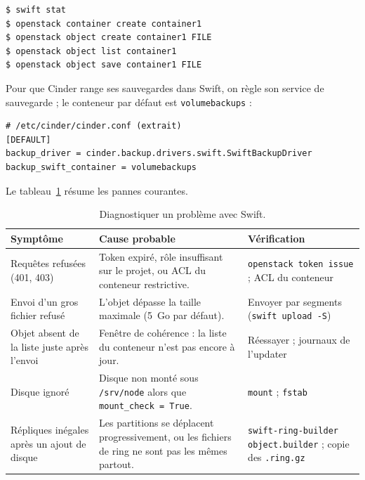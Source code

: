 \par\noindent\begin{minipage}{\linewidth}
\begin{lstlisting}[style=terminal]
$ swift stat
$ openstack container create container1
$ openstack object create container1 FILE
$ openstack object list container1
$ openstack object save container1 FILE
\end{lstlisting}
\end{minipage}\par

Pour que Cinder range ses sauvegardes dans Swift, on règle son service de sauvegarde ; le conteneur par défaut est
\texttt{volumebackups} \parencite{cinder-backup-swift} :

\par\noindent\begin{minipage}{\linewidth}
\begin{lstlisting}
# /etc/cinder/cinder.conf (extrait)
[DEFAULT]
backup_driver = cinder.backup.drivers.swift.SwiftBackupDriver
backup_swift_container = volumebackups
\end{lstlisting}
\end{minipage}\par

Le tableau~\ref{tab:sw-pannes} résume les pannes courantes.

\begin{table}[!ht]
\centering
\renewcommand{\arraystretch}{1.3}
\begin{tabular}{@{}>{\raggedright\arraybackslash}p{4.4cm}>{\raggedright\arraybackslash}p{5.8cm}>{\raggedright\arraybackslash}p{5.3cm}@{}}
\toprule
\textbf{Symptôme} & \textbf{Cause probable} & \textbf{Vérification} \\
\midrule
Requêtes refusées (401, 403) & Token expiré, rôle insuffisant sur le projet, ou ACL du conteneur restrictive. & \texttt{openstack token issue} ; ACL du conteneur \\
Envoi d'un gros fichier refusé & L'objet dépasse la taille maximale (5~Go par défaut). & Envoyer par segments (\texttt{swift upload -S}) \\
Objet absent de la liste juste après l'envoi & Fenêtre de cohérence : la liste du conteneur n'est pas encore à jour. & Réessayer ; journaux de l'updater \\
Disque ignoré & Disque non monté sous \texttt{/srv/node} alors que \texttt{mount\_\allowbreak check = True}. & \texttt{mount} ; \texttt{fstab} \\
Répliques inégales après un ajout de disque & Les partitions se déplacent progressivement, ou les fichiers de ring ne sont pas les mêmes partout. & \texttt{swift-ring-builder object.builder} ; copie des \texttt{.ring.gz} \\
\bottomrule
\end{tabular}
\caption{Diagnostiquer un problème avec Swift.}
\label{tab:sw-pannes}
\end{table}

